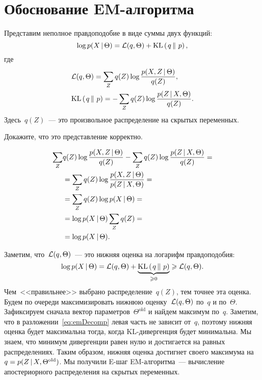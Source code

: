 \documentclass[12pt,fleqn]{article}
\begin{document}
\section{Обоснование EM-алгоритма}
Представим неполное правдоподобие в виде суммы двух функций:
\begin{equation}
\label{eq:emDecomp}
    \log p(X \mspace{3mu}{|}\mspace{3mu} \Theta)
    =
    \mathcal{L}(q, \Theta)
    +
    \text{KL} \left(\left. {q} \mspace{3mu} \right\| \mspace{3mu} {p} \right),
\end{equation}
где
\begin{align*}
    &\mathcal{L}(q, \Theta)
    =
    \sum_Z
        q(Z)
        \log \frac{
            p(X, Z \mspace{3mu}{|}\mspace{3mu} \Theta)
        }{
            q(Z)
        },\\
    &\text{KL} \left(\left. {q} \mspace{3mu} \right\| \mspace{3mu} {p} \right)
    =
    -\sum_Z
        q(Z)
        \log \frac{
            p(Z \mspace{3mu}{|}\mspace{3mu} X, \Theta)
        }{
            q(Z)
        }.
\end{align*}
Здесь~$q(Z)$~--- это произвольное распределение на скрытых переменных.

\begin{vkProblem}
    Докажите, что это представление корректно.
\end{vkProblem}

\begin{esSolution}
    \begin{align*}
        \sum_Z
            &q(Z)
            \log \frac{
                p(X, Z \mspace{3mu}{|}\mspace{3mu} \Theta)
            }{
                q(Z)
            }
        -
        \sum_Z
            q(Z)
            \log \frac{
                p(Z \mspace{3mu}{|}\mspace{3mu} X, \Theta)
            }{
                q(Z)
            }
        =\\
        &=
        \sum_Z
            q(Z)
            \log \frac{
                p(X, Z \mspace{3mu}{|}\mspace{3mu} \Theta)
            }{
                p(Z \mspace{3mu}{|}\mspace{3mu} X, \Theta)
            }
        =\\
        &=
        \sum_Z
            q(Z)
            \log p(X \mspace{3mu}{|}\mspace{3mu} \Theta)
        =\\
        &=
        \log p(X \mspace{3mu}{|}\mspace{3mu} \Theta)
        \sum_Z
            q(Z)
        =\\
        &=
        \log p(X \mspace{3mu}{|}\mspace{3mu} \Theta).
    \end{align*}
\end{esSolution}

Заметим, что~$\mathcal{L}(q, \Theta)$~--- это нижняя оценка на логарифм правдоподобия:
\[
    \log p(X \mspace{3mu}{|}\mspace{3mu} \Theta)
    =
    \mathcal{L}(q, \Theta)
    +
    \underbrace{\text{KL} \left(\left. {q} \mspace{3mu} \right\| \mspace{3mu} {p} \right)}_{\geqslant 0}
    \geqslant
    \mathcal{L}(q, \Theta).
\]
Чем~<<правильнее>> выбрано распределение~$q(Z)$, тем точнее эта оценка.
Будем по очереди максимизировать нижнюю оценку~$\mathcal{L}(q, \Theta)$ по~$q$ и по~$\Theta$.
Зафиксируем сначала вектор параметров~$\Theta^\text{old}$
и найдем максимум по~$q$.
Заметим, что в разложении~\eqref{eq:emDecomp} левая часть
не зависит от~$q$, поэтому нижняя оценка будет максимальна тогда,
когда KL-дивергенция будет минимальна.
Мы знаем, что минимум дивергенции равен нулю и достигается
на равных распределениях.
Таким образом, нижняя оценка достигнет своего максимума
на~$q = p(Z \mspace{3mu}{|}\mspace{3mu} X, \Theta^\text{old})$.
Мы получили E-шаг EM-алгоритма~--- вычисление апостериорного распределения
на скрытых переменных.
\end{document}
